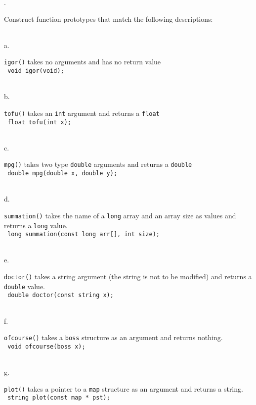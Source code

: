 \documentclass{amsart}
\begin{document}
. 
\begin{minipage}[t]{11.5 cm}
	Construct function prototypes that match the following descriptions:
\end{minipage} \\
\phantom{1. }a.
\begin{minipage}[t]{11.5 cm}
	\texttt{igor()} takes no arguments and has no return value \\
	\verb+ void igor(void);+
\end{minipage} \\[1ex]
\phantom{1. }b.
\begin{minipage}[t]{11.5 cm}
	\texttt{tofu()} takes an \texttt{int} argument and returns a \texttt{float}\\
	\verb+ float tofu(int x);+
	{} %
\end{minipage}\\[1ex]
\phantom{1. }c.
\begin{minipage}[t]{11.5 cm}
	\texttt{mpg()} takes two type \texttt{double} arguments and returns a \texttt{double} \\
	\verb+ double mpg(double x, double y);+
	{} %
\end{minipage}\\[1ex]
\phantom{1. }d.
\begin{minipage}[t]{11.5 cm}
	\texttt{summation()} takes the name of a \texttt{long} array and an array size as values and returns a \texttt{long} value. \\
	\verb+ long summation(const long arr[], int size); +
	{} %
\end{minipage}\\[1ex]
\phantom{1. }e.
\begin{minipage}[t]{11.5 cm}
	\texttt{doctor()} takes a string argument (the string is not to be modified) and returns a \texttt{double} value. \\
	\verb+ double doctor(const string x);+
	{} %
\end{minipage} \\[1ex]
\phantom{1. }f.
\begin{minipage}[t]{11.5 cm}
	\texttt{ofcourse()} takes a \texttt{boss} structure as an argument and returns nothing.\\
	\verb+ void ofcourse(boss x);+
\end{minipage}\\[1ex]
\phantom{1. }g.
\begin{minipage}[t]{11.5 cm}
	\texttt{plot()} takes a pointer to a \texttt{map} structure as an argument and returns a string. \\
	\verb+ string plot(const map * pst);+
	{} %
\end{minipage}
\vfill
\end{document}

